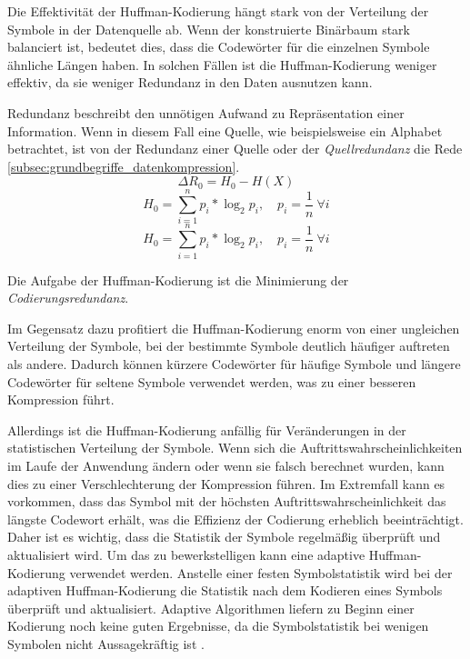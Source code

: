 Die Effektivität der Huffman-Kodierung hängt stark von der Verteilung der Symbole in der Datenquelle ab. 
Wenn der konstruierte Binärbaum stark balanciert ist, bedeutet dies, dass die Codewörter für die einzelnen Symbole ähnliche Längen haben. 
In solchen Fällen ist die Huffman-Kodierung weniger effektiv, da sie weniger Redundanz in den Daten ausnutzen kann.

Redundanz beschreibt den unnötigen Aufwand zu Repräsentation einer Information.
Wenn in diesem Fall eine Quelle, wie beispielsweise ein Alphabet betrachtet, ist von der Redundanz einer Quelle oder der \textit{Quellredundanz} die Rede \ref{subsec:grundbegriffe_datenkompression}.
\begin{equation*}
\Delta R_0 = H_0 - H(X)
\end{equation*}
\begin{equation*}
H_0 = \sum_{i=1}^{n} p_i * \log_2{p_i} , \quad p_i = \frac{1}{n} \ \forall i
\end{equation*}
\begin{equation*}
H_0 = \sum_{i=1}^{n} p_i * \log_2{p_i} , \quad p_i = \frac{1}{n} \ \forall i
\end{equation*}

Die Aufgabe der Huffman-Kodierung ist die Minimierung der \textit{Codierungsredundanz}.


Im Gegensatz dazu profitiert die Huffman-Kodierung enorm von einer ungleichen Verteilung der Symbole, bei der bestimmte Symbole deutlich häufiger auftreten als andere. 
Dadurch können kürzere Codewörter für häufige Symbole und längere Codewörter für seltene Symbole verwendet werden, was zu einer besseren Kompression führt.

Allerdings ist die Huffman-Kodierung anfällig für Veränderungen in der statistischen Verteilung der Symbole. 
Wenn sich die Auftrittswahrscheinlichkeiten im Laufe der Anwendung ändern oder wenn sie falsch berechnet wurden, kann dies zu einer Verschlechterung der Kompression führen. 
Im Extremfall kann es vorkommen, dass das Symbol mit der höchsten Auftrittswahrscheinlichkeit das längste Codewort erhält, was die Effizienz der Codierung erheblich beeinträchtigt. 
Daher ist es wichtig, dass die Statistik der Symbole regelmäßig überprüft und aktualisiert wird.
Um das zu bewerkstelligen kann eine adaptive Huffman-Kodierung verwendet werden. 
Anstelle einer festen Symbolstatistik wird bei der adaptiven Huffman-Kodierung die Statistik nach dem Kodieren eines Symbols überprüft und aktualisiert. 
Adaptive Algorithmen liefern zu Beginn einer Kodierung noch keine guten Ergebnisse, da die Symbolstatistik bei wenigen Symbolen nicht Aussagekräftig ist \cite{Jeon1998}. 

